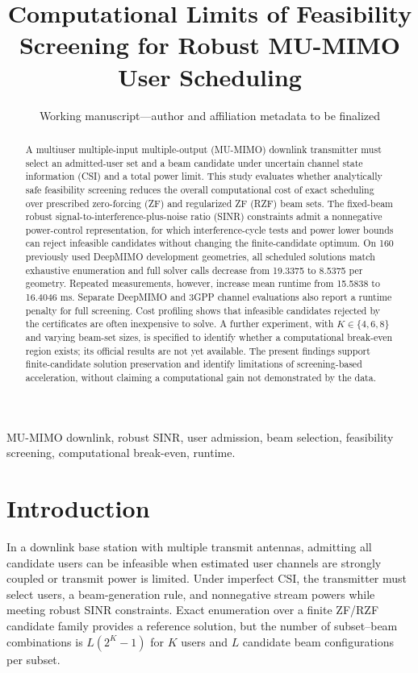 \documentclass[journal]{IEEEtran}
\title{Computational Limits of Feasibility Screening for Robust MU-MIMO User Scheduling}
\author{Working manuscript---author and affiliation metadata to be finalized}
\begin{document}
\maketitle
\begin{abstract}
A multiuser multiple-input multiple-output (MU-MIMO) downlink transmitter must select an admitted-user set and a beam candidate under uncertain channel state information (CSI) and a total power limit. This study evaluates whether analytically safe feasibility screening reduces the overall computational cost of exact scheduling over prescribed zero-forcing (ZF) and regularized ZF (RZF) beam sets. The fixed-beam robust signal-to-interference-plus-noise ratio (SINR) constraints admit a nonnegative power-control representation, for which interference-cycle tests and power lower bounds can reject infeasible candidates without changing the finite-candidate optimum. On 160 previously used DeepMIMO development geometries, all scheduled solutions match exhaustive enumeration and full solver calls decrease from 19.3375 to 8.5375 per geometry. Repeated measurements, however, increase mean runtime from 15.5838 to 16.4046 ms. Separate DeepMIMO and 3GPP channel evaluations also report a runtime penalty for full screening. Cost profiling shows that infeasible candidates rejected by the certificates are often inexpensive to solve. A further experiment, with $K\in\{4,6,8\}$ and varying beam-set sizes, is specified to identify whether a computational break-even region exists; its official results are not yet available. The present findings support finite-candidate solution preservation and identify limitations of screening-based acceleration, without claiming a computational gain not demonstrated by the data.
\end{abstract}
\begin{IEEEkeywords}
MU-MIMO downlink, robust SINR, user admission, beam selection, feasibility screening, computational break-even, runtime.
\end{IEEEkeywords}
\section{Introduction}
In a downlink base station with multiple transmit antennas, admitting all candidate users can be infeasible when estimated user channels are strongly coupled or transmit power is limited. Under imperfect CSI, the transmitter must select users, a beam-generation rule, and nonnegative stream powers while meeting robust SINR constraints. Exact enumeration over a finite ZF/RZF candidate family provides a reference solution, but the number of subset--beam combinations is $L(2^K-1)$ for $K$ users and $L$ candidate beam configurations per subset.
\end{document}
